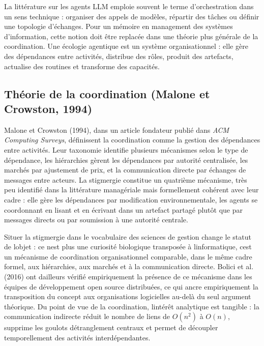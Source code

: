 La littérature sur les agents LLM emploie souvent le terme d'orchestration dans un sens technique : organiser des appels de modèles, répartir des tâches ou définir une topologie d'échanges. Pour un mémoire en management des systèmes d'information, cette notion doit être replacée dans une théorie plus générale de la coordination. Une écologie agentique est un système organisationnel : elle gère des dépendances entre activités, distribue des rôles, produit des artefacts, actualise des routines et transforme des capacités.

\subsection{Th\'eorie de la coordination (Malone et Crowston, 1994)}

Malone et Crowston (1994), dans un article fondateur publié dans
\emph{ACM Computing Surveys}, définissent la coordination comme la
gestion des dépendances entre activités. Leur taxonomie identifie
plusieurs mécanismes selon le type de dépendance, les hiérarchies gèrent
les dépendances par autorité centralisée, les marchés par ajustement de
prix, et la communication directe par échanges de messages entre
acteurs. La stigmergie constitue un quatrième mécanisme, très peu
identifié dans la littérature managériale mais formellement cohérent
avec leur cadre : elle gère les dépendances par modification
environnementale, les agents se coordonnant en lisant et en écrivant
dans un artefact partagé plutôt que par messages directs ou par
soumission à une autorité centrale.

Situer la stigmergie dans le vocabulaire des sciences de gestion change
le statut de l\textquotesingle objet : ce n\textquotesingle est plus
une curiosité biologique transposée à
l\textquotesingle informatique, c\textquotesingle est un mécanisme de
coordination organisationnel comparable, dans le même cadre formel, aux
hiérarchies, aux marchés et à la communication directe. Bolici et al.
(2016) ont d\textquotesingle ailleurs vérifié empiriquement
la présence de ce mécanisme dans les équipes de développement open
source distribuées, ce qui ancre empiriquement la transposition du
concept aux organisations logicielles au-delà du seul argument
théorique. Du
point de vue de la coordination, l\textquotesingle intérêt analytique
est tangible : la communication indirecte réduit le nombre de liens de
$O(n^2)$ à $O(n)$, supprime les goulots
d\textquotesingle étranglement centraux et permet de découpler
temporellement des activités interdépendantes.

